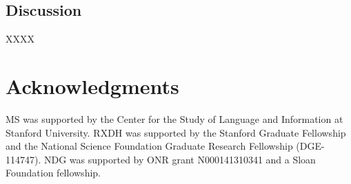 \documentclass[10pt,letterpaper]{article}
\begin{document}
\subsection{Discussion}

XXXX

\section{\bf Acknowledgments}
\small
MS was supported by the Center for the Study of Language and Information at Stanford University. RXDH was supported by the Stanford Graduate Fellowship and the National Science Foundation Graduate Research Fellowship (DGE-114747). NDG was supported by ONR grant N000141310341 and a Sloan Foundation fellowship.


\setlength{\bibleftmargin}{.125in}
\setlength{\bibindent}{-\bibleftmargin}


\end{document}
